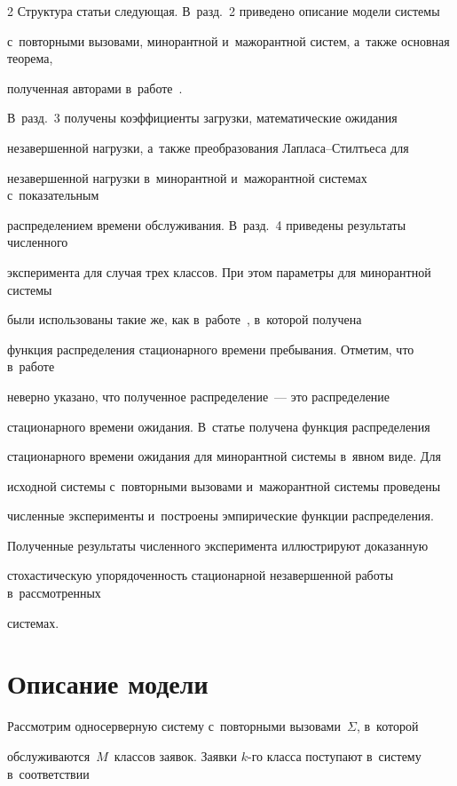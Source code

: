 \begin{multicols}{2}
Структура статьи следующая. В~разд.~2 приведено описание модели сис\-те\-мы 


с~повторными вызовами, минорантной и~мажорантной сис\-тем, а~также основная тео\-ре\-ма, 


полученная авторами в~работе~\cite{mathematics2022}.


В~разд.~3 получены коэффициенты загрузки, математические ожидания 


незавершенной нагрузки, а~также преобразования Лап\-ла\-са--Стилть\-еса для 


незавершенной нагрузки в~минорантной и~мажорантной сис\-те\-мах с~показательным 


распределением времени обслуживания. В~разд.~4 приведены результаты численного 


эксперимента для случая трех классов. При этом параметры для минорантной системы 


были использованы такие же, как в~работе~\cite{rego}, в~которой получена  


функция распределения  стационарного времени пребывания. Отметим, что  в~работе~\cite{rego} 


неверно указано, что полученное распределение~--- это распределение 


стационарного времени ожидания. В~статье получена функция распределения  


стационарного времени ожидания для минорантной сис\-те\-мы  в~явном  виде. Для 


исходной сис\-те\-мы с~повторными вызовами и~мажорантной  сис\-те\-мы проведены 


численные эксперименты и~построены эмпирические функции распределения. 


Полученные результаты численного эксперимента иллюстрируют доказанную 


стохастическую упо\-ря\-до\-чен\-ность стационарной незавершенной работы в~рассмотренных 


сис\-те\-мах.





\section{Описание модели}





Рассмотрим односерверную систему с~повторными вызовами~$\Sigma$, в~которой 


обслуживаются~$M$~классов заявок. Заявки $k$-го класса поступают в~сис\-те\-му в~соответствии 



\end{multicols}
